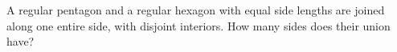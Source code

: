 A regular pentagon and a regular hexagon with equal side lengths are joined along one entire side, with disjoint interiors. How many sides does their union have?
